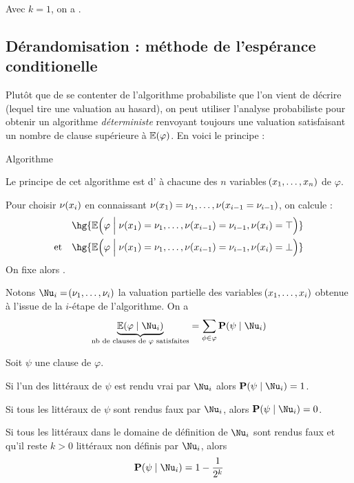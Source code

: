 \documentclass[a4paper,french,bookmarks]{book}
\begin{document}
    \begin{corollary}{}{}
        Avec $k = 1$, on a .
    \end{corollary}

    \subsection{Dérandomisation : méthode de l'espérance conditionelle}
    
    Plutôt que de se contenter de l'algorithme probabiliste que l'on vient de décrire (lequel tire une valuation au hasard), on peut utiliser l'analyse probabiliste pour obtenir un algorithme \emph{déterministe} renvoyant toujours une valuation satisfaisant un nombre de clause supérieure à $\mathbb{E}\!\left(\varphi\right)$. En voici le principe :
    
    \begin{form}{Algorithme}{}
    
        Le principe de cet algorithme est d' à chacune des $n$ variables $\!\left(x_1, \dots, x_n\right)$ de $\varphi$.
        
        \begin{enumerate}
            \itt Pour choisir $\nu\!\left(x_i\right)$ en connaissant $\nu\!\left(x_1\right) = \nu_1, \dots, \nu\!\left(x_{i-1} = \nu_{i-1}\right)$, on calcule :
            \begin{align*}
                && \hg{\bdE\p{\vphantom{\dfrac{a}{a}}\varphi \enstq \nu\p{x_1} = \nu_1, \dots, \nu\p{x_{i-1}} = \nu_{i-1}, \nu\p{x_i} = \top}}\\
                \text{et} && \hg{\bdE\p{\vphantom{\dfrac{a}{a}}\varphi \enstq \nu\p{x_1} = \nu_1, \dots, \nu\p{x_{i-1}} = \nu_{i-1}, \nu\p{x_i} = \bot}}
            \end{align*}
            On fixe alors .
        \end{enumerate}
   \end{form}
   
   Notons $\Nu_i = \p{\nu_1, \dots, \nu_i}$ la valuation partielle des variables $\!\left(x_1, \dots, x_i\right)$ obtenue à l'issue de la $i$-\ieme étape de l'algorithme. On a 
   \[ \underbrace{\bdE\p{\varphi \enstq \Nu_i}}_{\text{nb de clauses de $\varphi$ satisfaites}} = \sum_{\phi \in \varphi} \bbP\p{\psi \enstq \Nu_i}\]
   
   Soit $\psi$ une clause de $\varphi$.
   \begin{enumerate}
       \itt Si l'un des littéraux de $\psi$ est rendu vrai par $\Nu_i$ alors $\bbP\p{\psi \enstq \Nu_i} = 1$.
       
       \itt Si tous les littéraux de $\psi$ sont rendus faux par $\Nu_i$, alors $\bbP\p{\psi \enstq \Nu_i} = 0$.
       
       \itt Si tous les littéraux dans le domaine de définition de $\Nu_i$ sont rendus faux et qu'il reste $k > 0$ littéraux non définis par $\Nu_i$, alors
       \[ \bbP\p{\psi \enstq \Nu_i} = 1 - \dfrac{1}{2^k}\]
   \end{enumerate}
   
\end{document}
